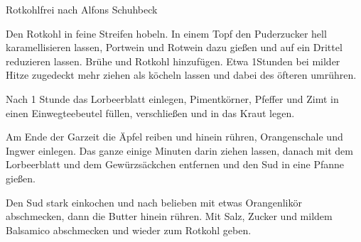 \begin{recipe}{Rotkohl}{frei nach Alfons Schuhbeck}
  \inglist

  \steps

  Den Rotkohl in feine Streifen hobeln. In einem Topf den Puderzucker hell
  karamellisieren lassen, Portwein und Rotwein dazu gießen und auf ein Drittel
  reduzieren lassen. Brühe und Rotkohl hinzufügen. Etwa 1\halb Stunden bei
  milder Hitze zugedeckt mehr ziehen als köcheln lassen und dabei des öfteren
  umrühren.

  Nach 1 Stunde das Lorbeerblatt einlegen, Pimentkörner, Pfeffer und Zimt in
  einen Einwegteebeutel füllen, verschließen und in das Kraut legen.

  Am Ende der Garzeit die Äpfel reiben und hinein rühren, Orangenschale und
  Ingwer einlegen. Das ganze einige Minuten darin ziehen lassen, danach mit dem
  Lorbeerblatt und dem Gewürzsäckchen entfernen und den Sud in eine Pfanne
  gießen.

  Den Sud stark einkochen und nach belieben mit etwas Orangenlikör abschmecken,
  dann die Butter hinein rühren. Mit Salz, Zucker und mildem Balsamico
  abschmecken und wieder zum Rotkohl geben.
\end{recipe}
